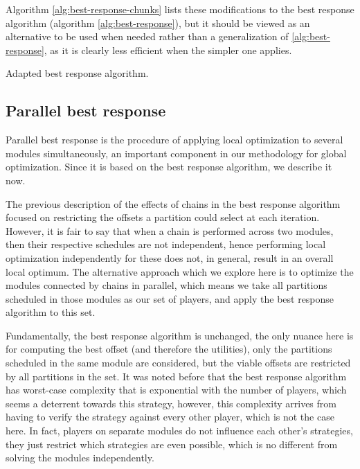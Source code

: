 \documentclass[main.tex]{subfiles}
\begin{document}
Algorithm \ref{alg:best-response-chunks} lists these modifications to the best response algorithm (algorithm \ref{alg:best-response}), but it should be viewed as an alternative to be used when needed rather than a generalization of \ref{alg:best-response}, as it is clearly less efficient when the simpler one applies. 

\begin{algorithm}
    
    \caption{Adapted best response algorithm.}
    \label{alg:best-response-chunks}
\end{algorithm}

\subsection{Parallel best response}
\label{sec:parallel}

Parallel best response is the procedure of applying local optimization to several modules simultaneously, an important component in our methodology for global optimization.
Since it is based on the best response algorithm, we describe it now.

The previous description of the effects of chains in the best response algorithm focused on restricting the offsets a partition could select at each iteration.
However, it is fair to say that when a chain is performed across two modules, then their respective schedules are not independent, hence performing local optimization independently for these does not, in general, result in an overall local optimum.
The alternative approach which we explore here is to optimize the modules connected by chains in parallel, which means we take all partitions scheduled in those modules as our set of players, and apply the best response algorithm to this set.

Fundamentally, the best response algorithm is unchanged, the only nuance here is for computing the best offset (and therefore the utilities), only the partitions scheduled in the same module are considered, but the viable offsets are restricted by all partitions in the set.
It was noted before that the best response algorithm has worst-case complexity that is exponential with the number of players, which seems a deterrent towards this strategy, however, this complexity arrives from having to verify the strategy against every other player, which is not the case here.
In fact, players on separate modules do not influence each other's strategies, they just restrict which strategies are even possible, which is no different from solving the modules independently.
\end{document}
